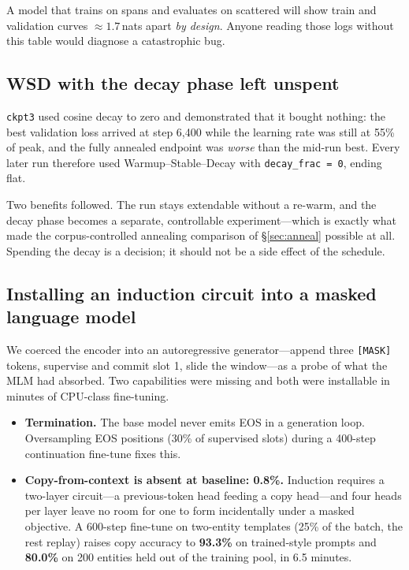 \documentclass[11pt,a4paper]{article}
\newcommand{\nats}[1]{\ensuremath{#1}\,nats}
\begin{document}
A model that trains on spans and evaluates on scattered will show train and validation curves
$\approx$\nats{1.7} apart \emph{by design}. Anyone reading those logs without this table would
diagnose a catastrophic bug.

\subsection{WSD with the decay phase left unspent}

\texttt{ckpt3} used cosine decay to zero and demonstrated that it bought nothing: the best
validation loss arrived at step 6{,}400 while the learning rate was still at 55\% of peak, and
the fully annealed endpoint was \emph{worse} than the mid-run best. Every later run therefore
used Warmup--Stable--Decay with \texttt{decay\_frac = 0}, ending flat.

Two benefits followed. The run stays extendable without a re-warm, and the decay phase becomes
a separate, controllable experiment---which is exactly what made the corpus-controlled
annealing comparison of \S\ref{sec:anneal} possible at all. Spending the decay is a decision;
it should not be a side effect of the schedule.

\subsection{Installing an induction circuit into a masked language model}\label{sec:autoreg}

We coerced the encoder into an autoregressive generator---append three \texttt{[MASK]} tokens,
supervise and commit slot 1, slide the window---as a probe of what the MLM had absorbed. Two
capabilities were missing and both were installable in minutes of CPU-class fine-tuning.

\begin{itemize}
\item \textbf{Termination.} The base model never emits EOS in a generation loop. Oversampling
EOS positions (30\% of supervised slots) during a 400-step continuation fine-tune fixes this.
\item \textbf{Copy-from-context is absent at baseline: 0.8\%.} Induction requires a two-layer
circuit---a previous-token head feeding a copy head---and four heads per layer leave no room
for one to form incidentally under a masked objective. A 600-step fine-tune on two-entity
templates (25\% of the batch, the rest replay) raises copy accuracy to \textbf{93.3\%} on
trained-style prompts and \textbf{80.0\%} on 200 entities held out of the training pool, in
6.5 minutes.
\end{itemize}
\end{document}
